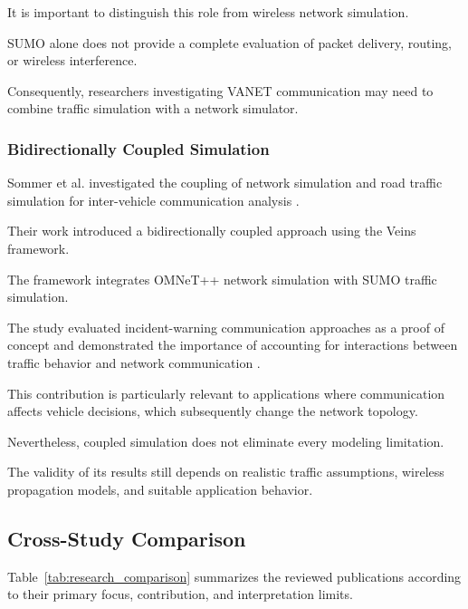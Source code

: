 It is important to
distinguish this role
from wireless network
simulation.

SUMO alone does not
provide a complete
evaluation of packet
delivery, routing,
or wireless interference.

Consequently, researchers
investigating VANET
communication may need
to combine traffic
simulation with a
network simulator.

\subsubsection{Bidirectionally Coupled Simulation}

Sommer et al. investigated
the coupling of network
simulation and road
traffic simulation for
inter-vehicle communication
analysis \cite{Sommer2011}.

Their work introduced
a bidirectionally coupled
approach using the
Veins framework.

The framework integrates
OMNeT++ network simulation
with SUMO traffic
simulation.

The study evaluated
incident-warning
communication approaches
as a proof of concept
and demonstrated the
importance of accounting
for interactions between
traffic behavior and
network communication
\cite{Sommer2011}.

This contribution is
particularly relevant
to applications where
communication affects
vehicle decisions,
which subsequently
change the network
topology.

Nevertheless, coupled
simulation does not
eliminate every
modeling limitation.

The validity of
its results still
depends on realistic
traffic assumptions,
wireless propagation
models, and suitable
application behavior.

\subsection{Cross-Study Comparison}

Table~\ref{tab:research_comparison}
summarizes the reviewed
publications according
to their primary focus,
contribution, and
interpretation limits.

